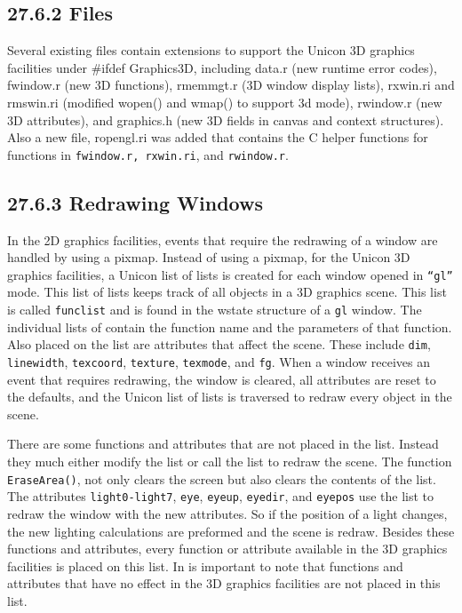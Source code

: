 \subsection[27.6.2 Files]{27.6.2 Files}

Several existing files contain extensions to support the Unicon 3D
graphics facilities under \#ifdef Graphics3D, including data.r (new
runtime error codes), fwindow.r (new 3D functions), rmemmgt.r (3D
window display lists), rxwin.ri and rmswin.ri (modified wopen() and
wmap() to support 3d mode), rwindow.r (new 3D attributes), and
graphics.h (new 3D fields in canvas and context structures). Also a
new file, ropengl.ri was added that contains the C helper functions
for functions in \texttt{fwindow.r, rxwin.ri}, and \texttt{rwindow.r}.

\subsection[27.6.3 Redrawing Windows]{27.6.3 Redrawing Windows}

In the 2D graphics facilities, events that require the redrawing of a
window are handled by using a pixmap. Instead of using a pixmap, for
the Unicon 3D graphics facilities, a Unicon list of lists is created
for each window opened in \texttt{{}``gl''} mode. This list of lists
keeps track of all objects in a 3D graphics scene. This list is called
\texttt{funclist} and is found in the wstate structure of a
\texttt{{\textquotedbl}gl{\textquotedbl}} window. The individual lists
of contain the function name and the parameters of that function. Also
placed on the list are attributes that affect the scene. These include
\texttt{dim}, \texttt{linewidth}, \texttt{texcoord}, \texttt{texture},
\texttt{texmode}, and \texttt{fg}. When a window receives an event
that requires redrawing, the window is cleared, all attributes are
reset to the defaults, and the Unicon list of lists is traversed to
redraw every object in the scene.

There are some functions and attributes that are not placed in the
list. Instead they much either modify the list or call the list to
redraw the scene. The function \texttt{EraseArea()}, not only clears
the screen but also clears the contents of the list. The attributes
\texttt{light0-light7}, \texttt{eye}, \texttt{eyeup}, \texttt{eyedir},
and \texttt{eyepos} use the list to redraw the window with the new
attributes. So if the position of a light changes, the new lighting
calculations are preformed and the scene is redraw. Besides these
functions and attributes, every function or attribute available in the
3D graphics facilities is placed on this list. In is important to note
that functions and attributes that have no effect in the 3D graphics
facilities are not placed in this list.

